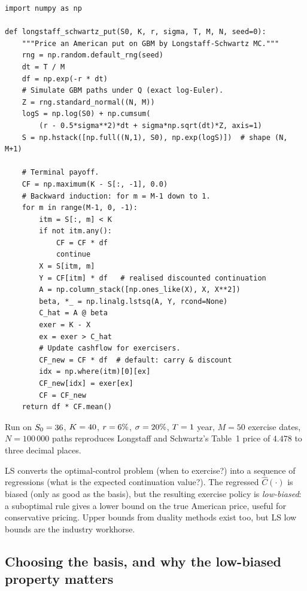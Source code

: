 \begin{lstlisting}[caption={Longstaff--Schwartz American put pricer.}, label={lst:longstaff_schwartz}]
import numpy as np

def longstaff_schwartz_put(S0, K, r, sigma, T, M, N, seed=0):
    """Price an American put on GBM by Longstaff-Schwartz MC."""
    rng = np.random.default_rng(seed)
    dt = T / M
    df = np.exp(-r * dt)
    # Simulate GBM paths under Q (exact log-Euler).
    Z = rng.standard_normal((N, M))
    logS = np.log(S0) + np.cumsum(
        (r - 0.5*sigma**2)*dt + sigma*np.sqrt(dt)*Z, axis=1)
    S = np.hstack([np.full((N,1), S0), np.exp(logS)])  # shape (N, M+1)

    # Terminal payoff.
    CF = np.maximum(K - S[:, -1], 0.0)
    # Backward induction: for m = M-1 down to 1.
    for m in range(M-1, 0, -1):
        itm = S[:, m] < K
        if not itm.any():
            CF = CF * df
            continue
        X = S[itm, m]
        Y = CF[itm] * df   # realised discounted continuation
        A = np.column_stack([np.ones_like(X), X, X**2])
        beta, *_ = np.linalg.lstsq(A, Y, rcond=None)
        C_hat = A @ beta
        exer = K - X
        ex = exer > C_hat
        # Update cashflow for exercisers.
        CF_new = CF * df  # default: carry & discount
        idx = np.where(itm)[0][ex]
        CF_new[idx] = exer[ex]
        CF = CF_new
    return df * CF.mean()
\end{lstlisting}

Run on $S_0 = 36$, $K = 40$, $r = 6\%$, $\sigma = 20\%$,
$T = 1$ year, $M = 50$ exercise dates, $N = 100\,000$ paths
reproduces Longstaff and Schwartz's Table~1 price of $4.478$ to three
decimal places.

\begin{intuitionbox}
LS converts the optimal-control problem (when to exercise?) into a
sequence of regressions (what is the expected continuation value?).
The regressed $\hat C(\cdot)$ is biased (only as good as the basis),
but the resulting exercise policy is \emph{low-biased}: a
suboptimal rule gives a lower bound on the true American price,
useful for conservative pricing.  Upper bounds from duality methods
exist too, but LS low bounds are the industry workhorse.
\end{intuitionbox}

\subsection{Choosing the basis, and why the low-biased property matters}

